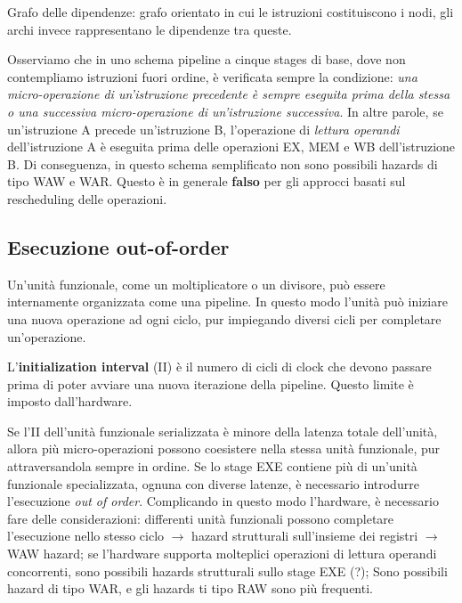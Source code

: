 \begin{info}
    Grafo delle dipendenze: grafo orientato in cui le istruzioni costituiscono i nodi, gli archi invece rappresentano le dipendenze tra queste.
\end{info}

Osserviamo che in uno schema pipeline a cinque stages di base, dove non contempliamo istruzioni fuori ordine, è verificata sempre la condizione: \textit{una micro-operazione di un'istruzione precedente è sempre eseguita prima della stessa o una successiva micro-operazione di un'istruzione successiva}. In altre parole, se un'istruzione A precede un'istruzione B, l'operazione di \textit{lettura operandi} dell'istruzione A è eseguita prima delle operazioni EX, MEM e WB dell'istruzione B. Di conseguenza, in questo schema semplificato non sono possibili hazards di tipo WAW e WAR. 
Questo è in generale \textbf{falso} per gli approcci basati sul rescheduling delle operazioni. 

\subsection{Esecuzione out-of-order}
Un'unità funzionale, come un moltiplicatore o un divisore, può essere internamente organizzata come una pipeline. In questo modo l'unità può iniziare una nuova operazione ad ogni ciclo, pur impiegando diversi cicli per completare un'operazione. 

\begin{info}
    L'\textbf{initialization interval} (II) è il numero di cicli di clock che devono passare prima di poter avviare una nuova iterazione della pipeline. Questo limite è imposto dall'hardware.
\end{info}

Se l'II dell'unità funzionale serializzata è minore della latenza totale dell'unità, allora più micro-operazioni possono coesistere nella stessa unità funzionale, pur attraversandola sempre in ordine. Se lo stage EXE contiene più di un'unità funzionale specializzata, ognuna con diverse latenze, è necessario introdurre l'esecuzione \textit{out of order}. 
Complicando in questo modo l'hardware, è necessario fare delle considerazioni: differenti unità funzionali possono completare l'esecuzione nello stesso ciclo $\rightarrow$ hazard strutturali sull'insieme dei registri $\rightarrow$ WAW hazard; se l'hardware supporta molteplici operazioni di lettura operandi concorrenti, sono possibili hazards strutturali sullo stage EXE (?); Sono possibili hazard di tipo WAR, e gli hazards ti tipo RAW sono più frequenti. 
